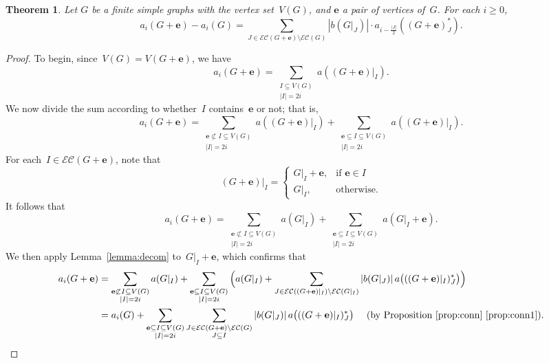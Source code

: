 \documentclass[10pt]{amsart}
\theoremstyle{plain}
\newtheorem{theorem}{Theorem}[section]
\numberwithin{equation}{section}
\theoremstyle{definition}
\newcommand{\edge}{\mathbf{e}}
\newcommand{\EC}{\mathcal{E}\mathcal{C}}
\begin{document}
\begin{theorem}\label{thm:decom}
    Let $G$ be a finite simple graphs with the vertex set~$V(G)$, and $\edge$ a pair of vertices of~$G$.
For each $i \geq 0$, 
    \begin{equation} \label{eqn:main_decomp}
    a_i(G+\edge) - a_i(G) = \sum_{J \in \EC(G+\edge) \setminus \EC(G)}\left\vert  b(G\vert_J) \right\vert \cdot a_{i- \frac{|J|}{2}}((G +\edge)^\ast_{J}).
    \end{equation}
\end{theorem}
\begin{proof}
    To begin, since~$V(G) = V(G+\edge)$, we have
    $$a_i(G+\edge) = \sum_{\substack{I\subseteq V(G)\\ |I| =2i}}a((G+\edge)\vert_I).
    $$
    We now divide the sum according to whether~$I$ contains~$\edge$ or not; that is,
    $$
    a_i(G+\edge) = \sum_{\substack{\edge \not\subset I\subseteq V(G)\\ |I| =2i}} a((G+\edge)\vert_I) + \sum_{\substack{\edge \subseteq I\subseteq V(G)\\ |I| =2i}} a((G+\edge)\vert_I).
    $$
    For each~$I \in \EC(G + \edge)$, note that
    $$
    (G+\edge)\vert_I = \begin{cases}
      G\vert_I +\edge, & \mbox{if } \edge \in I \\
      G\vert_I, & \mbox{otherwise}.
    \end{cases}
    $$
    It follows that
    $$
    a_i(G+\edge) = \sum_{\substack{\edge \not\subset I\subseteq V(G)\\ |I| =2i}} a(G\vert_I) + \sum_{\substack{\edge \subseteq I\subseteq V(G)\\ |I| =2i}} a(G\vert_I+\edge).
    $$
    We then apply Lemma~\ref{lemma:decom} to~$G\vert_I +\edge$, which confirms that
    \begin{align*}
      a_i(G+\edge) & = \sum_{\substack{\edge \not\subset I\subseteq V(G)\\ |I| =2i}} a(G\vert_I) + \sum_{\substack{\edge \subseteq I\subseteq V(G)\\ |I| =2i}} \Big(a(G\vert_I) + \sum_{J \in \EC((G+\edge)\vert_I) \setminus \EC(G\vert_I)} \left\vert b(G\vert_J) \right\vert a\big(((G+\edge)\vert_I)^\ast_J\big)\Big) \\
       & = a_i(G) + \sum_{\substack{\edge \subseteq I\subseteq V(G)\\ |I| =2i}} \sum_{\substack{J \in \EC(G+\edge) \setminus \EC(G) \\ J \subseteq I}} \left\vert b(G\vert_J) \right\vert a\big(((G+\edge)\vert_I)^\ast_J\big) \quad \text{ (by Proposition~\ref{prop:conn}~\eqref{prop:conn1})}.

\end{align*}
\end{proof}
\end{document}
